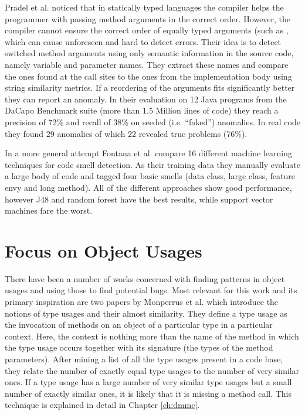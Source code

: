 Pradel et al. \cite{pradel2011detecting} noticed that in statically typed languages the compiler helps the programmer with passing method arguments in the correct order.
However, the compiler cannot ensure the correct order of equally typed arguments (such as , which can cause unforeseen and hard to detect errors.
Their idea is to detect switched method arguments using only semantic information in the source code, namely variable and parameter names.
They extract these names and compare the ones found at the call sites to the ones from the implementation body using string similarity metrics. 
If a reordering of the arguments fits significantly better they can report an anomaly.
In their evaluation on 12 Java programs from the DaCapo Benchmark suite (more than 1.5 Million lines of code) they reach a precision of 72\% and recall of 38\% on seeded (i.e. ``faked'') anomalies.
In real code they found 29 anomalies of which 22 revealed true problems (76\%).


In a more general attempt Fontana et al. \cite{fontana2013code}\cite{fontana2016comparing} compare 16 different machine learning techniques for code smell detection.
As their training data they manually evaluate a large body of code and tagged four basic smells (data class, large class, feature envy and long method).
All of the different approaches show good performance, however J48 and random forest have the best results, while support vector machines fare the worst.

\section{Focus on Object Usages}


There have been a number of works concerned with finding patterns in object usages and using those to find potential bugs.
Most relevant for this work and its primary inspiration are two papers by Monperrus et al.\cite{monperrus2010detecting}\cite{monperrus2013detecting} which introduce the notions of type usages and their almost similarity.
They define a type usage as the invocation of methods on an object of a particular type in a particular context.
Here, the context is nothing more than the name of the method in which the type usage occurs together with its signature (the types of the method parameters).
After mining a list of all the type usages present in a code base, they relate the number of exactly equal type usages to the number of very similar ones.
If a type usage has a large number of very similar type usages but a small number of exactly similar ones, it is likely that it is missing a method call.
This technique is explained in detail in Chapter \ref{ch:dmmc}.

